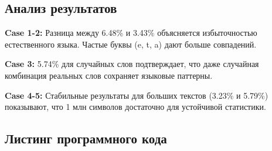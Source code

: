 \documentclass[12pt]{article}
\begin{document}
\subsection*{Анализ результатов}

\textbf{Case 1-2:} Разница между 6.48\% и 3.43\% объясняется избыточностью естественного языка. Частые буквы (e, t, a) дают больше совпадений.

\textbf{Case 3:} 5.74\% для случайных слов подтверждает, что даже случайная комбинация реальных слов сохраняет языковые паттерны.

\textbf{Case 4-5:} Стабильные результаты для больших текстов (3.23\% и 5.79\%) показывают, что 1 млн символов достаточно для устойчивой статистики. 
\subsection*{Листинг программного кода}
\end{document}
